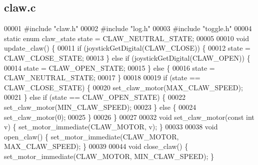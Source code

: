 \subsection{claw.\+c}
\label{claw_8c_source}

\begin{DoxyCode}
00001 \textcolor{preprocessor}{#include "claw.h"}
00002 \textcolor{preprocessor}{#include "log.h"}
00003 \textcolor{preprocessor}{#include "toggle.h"}
00004 \textcolor{keyword}{static} \textcolor{keyword}{enum} claw_state state = CLAW_NEUTRAL_STATE;
00005 
00010 \textcolor{keywordtype}{void} update_claw() \{
00011   \textcolor{keywordflow}{if} (joystickGetDigital(CLAW_CLOSE)) \{
00012     state = CLAW_CLOSE_STATE;
00013   \} \textcolor{keywordflow}{else} \textcolor{keywordflow}{if} (joystickGetDigital(CLAW_OPEN)) \{
00014     state = CLAW_OPEN_STATE;
00015   \} \textcolor{keywordflow}{else} \{
00016     state = CLAW_NEUTRAL_STATE;
00017   \}
00018 
00019   \textcolor{keywordflow}{if} (state == CLAW_CLOSE_STATE) \{
00020     set_claw_motor(MAX_CLAW_SPEED);
00021   \} \textcolor{keywordflow}{else} \textcolor{keywordflow}{if} (state == CLAW_OPEN_STATE) \{
00022     set_claw_motor(MIN_CLAW_SPEED);
00023   \} \textcolor{keywordflow}{else} \{
00024     set_claw_motor(0);
00025   \}
00026 \}
00027 
00032 \textcolor{keywordtype}{void} set_claw_motor(\textcolor{keyword}{const} \textcolor{keywordtype}{int} v) \{ set_motor_immediate(CLAW_MOTOR, v); \}
00033 
00038 \textcolor{keywordtype}{void} open_claw() \{ set_motor_immediate(CLAW_MOTOR, MAX_CLAW_SPEED); \}
00039 
00044 \textcolor{keywordtype}{void} close_claw() \{ set_motor_immediate(CLAW_MOTOR, MIN_CLAW_SPEED); \}
\end{DoxyCode}
